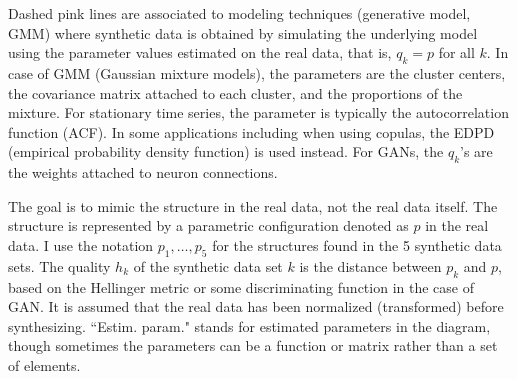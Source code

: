 \documentclass[oneside,10pt]{book}
\begin{document}
Dashed pink lines are associated to modeling techniques (generative model, GMM) where synthetic data is obtained by simulating the underlying model using the parameter values estimated on the real data, that is, $q_k = p$ for all $k$. In case of GMM (\textcolor{index}{Gaussian mixture models}), the parameters are the cluster centers, the covariance matrix attached to each cluster, and the proportions of the mixture. For stationary time series, the parameter is typically the autocorrelation function (ACF). In some applications including when using \textcolor{index}{copulas}, the EDPD (empirical probability density function) is used instead. For GANs, the $q_k$'s are the weights attached to neuron connections.

The goal is to mimic the structure in the real data, not the real data itself. The structure is represented by a parametric configuration denoted as $p$ in the real data. I use the notation $p_1,\dots,p_5$ for the structures found in the 5 synthetic data sets. The quality $h_k$ of the synthetic data set $k$ is the distance between $p_k$ and $p$, based on the 
\textcolor{index}{Hellinger metric} or some discriminating function in the case of GAN. It is assumed that the real data has been normalized (transformed) before synthesizing. ``Estim. param." stands for estimated parameters in the diagram, though sometimes the parameters can be a function or matrix rather than a set of elements.
\end{document}
